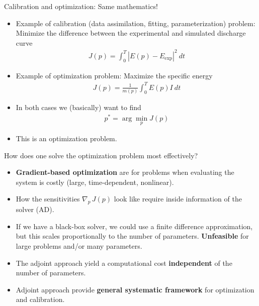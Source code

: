 \documentclass{beamer}
\begin{document}
\begin{frame}{Calibration and optimization: Same mathematics!}

  \begin{itemize}
  \item  Example of calibration (data assimilation, fitting, parameterization) problem:
    Minimize the difference between the experimental and
    simulated discharge curve
    \begin{align*}
      J(p) = \int_0^T |E(p) - E_\text{exp}|^2 \ dt
    \end{align*}
  \item Example of optimization problem: Maximize the specific energy
    \begin{align*}
      J(p) = \frac{1}{m(p)} \int_0^T E(p)I  \  dt
    \end{align*}
  \item In both cases we (basically) want to find
  \begin{align*}
    p^* = \arg \min_p J(p)
  \end{align*}
  \item This is an optimization problem.
  \end{itemize}

\end{frame}

\begin{frame}{How does one solve the optimization problem most effectively?}

  \begin{itemize}
  \item {\bf Gradient-based optimization} are for problems when
    evaluating the system is costly (large, time-dependent,
    nonlinear).
  \item How the sensitivities  $\nabla_p\, J(p)$ look like require inside information of the
    solver (AD).
  \item If we have a black-box solver, we could use a finite difference approximation, but this scales proportionally to the number of parameters.
    {\bf Unfeasible} for large problems and/or many parameters.
  \item The adjoint approach yield a computational cost {\bf independent}
    of the number of parameters.
  \item Adjoint approach provide {\bf general systematic framework} for optimization
    and calibration.
  \end{itemize}

\end{frame}
\end{document}
